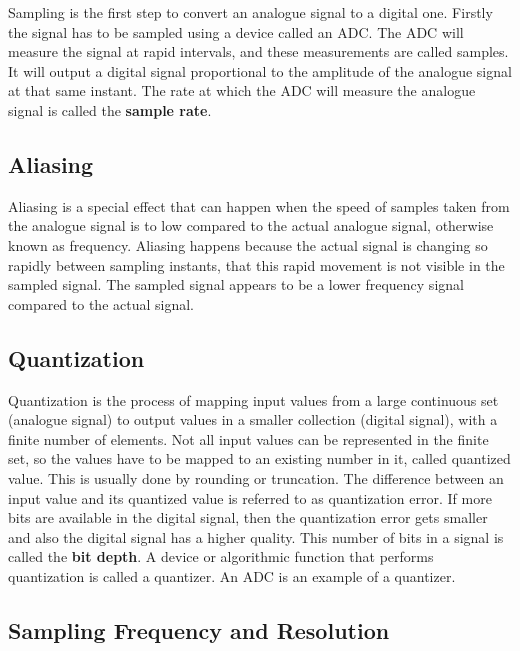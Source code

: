Sampling is the first step to convert an analogue signal to a digital one. Firstly the signal has to be sampled using a device called an \gls{ADC}. The \gls{ADC} will measure the signal at rapid intervals, and these measurements are called samples. It will output a digital signal proportional to the amplitude of the analogue signal at that same instant. The rate at which the \gls{ADC} will measure the analogue signal is called the \textbf{sample rate}.

\subsection{Aliasing}
\label{sub:Aliasing}

Aliasing is a special effect that can happen when the speed of samples taken from the analogue signal is to low compared to the actual analogue signal, otherwise known as frequency. Aliasing happens because the actual signal is changing so rapidly between sampling instants, that this rapid movement is not visible in the sampled signal. The sampled signal appears to be a lower frequency signal compared to the actual signal.

\subsection{Quantization}
\label{sub:Quantization}

Quantization is the process of mapping input values from a large continuous set (analogue signal) to output values in a smaller collection (digital signal), with a finite number of elements. Not all input values can be represented in the finite set, so the values have to be mapped to an existing number in it, called quantized value. This is usually done by rounding or truncation. The difference between an input value and its quantized value is referred to as quantization error.  If more bits are available in the digital signal, then the quantization error gets smaller and also the digital signal has a higher quality. This number of bits in a signal is called the \textbf{bit depth}. A device or algorithmic function that performs quantization is called a quantizer. An \gls{ADC} is an example of a quantizer. 

\subsection{Sampling Frequency and Resolution}
\label{sub:Sampling-Frequency-Resolution}


